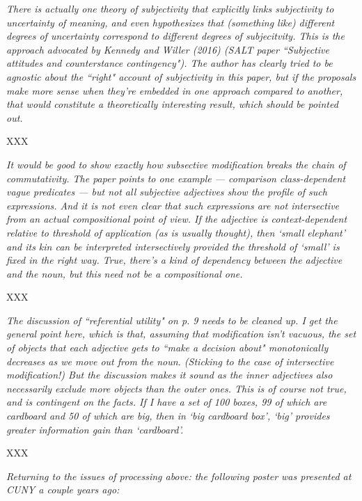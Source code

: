 \documentclass[12pt]{article}
\begin{document}
\emph{There is actually one theory of subjectivity that explicitly links
subjectivity to uncertainty of meaning, and even hypothesizes that
(something like) different degrees of uncertainty correspond to different
degrees of subjecitvity.  This is the approach advocated by Kennedy and
Willer (2016) (SALT paper ``Subjective attitudes and counterstance
contingency").  The author has clearly tried to be agnostic about the
``right" account of subjectivity in this paper, but if the proposals make
more sense when they're embedded in one approach compared to another, that
would constitute a theoretically interesting result, which should be pointed
out.}

XXX

\item \emph{It would be good to show exactly how subsective modification breaks the
chain of commutativity.  The paper points to one example --- comparison
class-dependent vague predicates --- but not all subjective adjectives show
the profile of such expressions.  And it is not even clear that such
expressions are not intersective from an actual compositional point of view.
If the adjective is context-dependent relative to threshold of application
(as is usually thought), then `small elephant' and its kin can be
interpreted intersectively provided the threshold of `small' is fixed in the
right way.  True, there's a kind of dependency between the adjective and the
noun, but this need not be a compositional one.}

XXX

\item \emph{The discussion of ``referential utility" on p. 9 needs to be cleaned up. 
I get the general point here, which is that, assuming that modification
isn't vacuous, the set of objects that each adjective gets to ``make a
decision about" monotonically decreases as we move out from the noun. 
(Sticking to the case of intersective modification!)  But the discussion
makes it sound as the inner adjectives also necessarily exclude more objects
than the outer ones.  This is of course not true, and is contingent on the
facts.  If I have a set of 100 boxes, 99 of which are cardboard and 50 of
which are big, then in `big cardboard box', `big' provides greater
information gain than `cardboard'.}

XXX

\item \emph{Returning to the issues of processing above:  the following poster was
presented at CUNY a couple years ago:}
\end{document}
